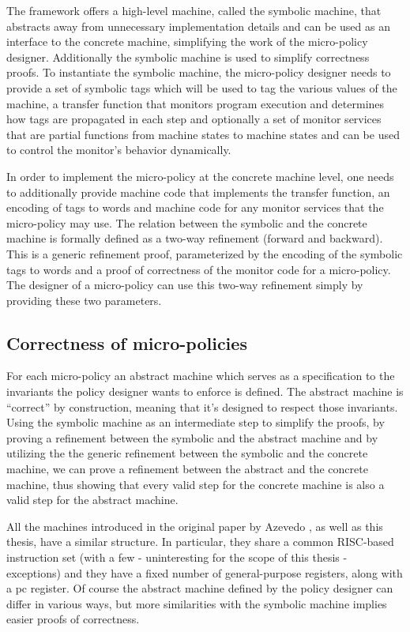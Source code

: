 The framework offers a high-level machine, called the symbolic machine, that
abstracts away from unnecessary implementation details and can be used as an 
interface to the concrete machine, simplifying the work of the micro-policy 
designer. Additionally the symbolic machine is used to simplify correctness 
proofs. To instantiate the symbolic machine, the micro-policy designer needs to
provide a set of symbolic tags which will be used to tag the various values of
the machine, a transfer function that monitors program execution and determines
how tags are propagated in each step and optionally a set of monitor services 
that are partial functions from machine states to machine states and can be used
to control the monitor's behavior dynamically.

In order to implement the micro-policy at the concrete machine level, one needs
to additionally provide machine code that implements the transfer function, an
encoding of tags to words and machine code for any monitor services that the
micro-policy may use. The relation between the symbolic and the concrete machine
is formally defined as a two-way refinement (forward and backward). This is a 
generic refinement proof, parameterized by the encoding of the symbolic tags to
words and a proof of correctness of the monitor code for a micro-policy.
The designer of a micro-policy can use this two-way refinement simply by
providing these two parameters.

\subsection{Correctness of micro-policies}\label{sec:verification}

For each micro-policy an abstract machine which serves as a specification to the
invariants the policy designer wants to enforce is defined. The abstract machine 
is ``correct'' by construction, meaning that it's designed to respect those 
invariants. Using the symbolic machine as an intermediate step to simplify the
proofs, by proving a refinement between the symbolic and the abstract machine 
and by utilizing the the generic refinement between the symbolic and the
concrete machine, we can prove a refinement between the abstract and
the concrete machine, thus showing that every valid step for the concrete
machine is also a valid step for the abstract machine. 

All the machines introduced in the original paper by Azevedo \ETAL 
\cite{pump_popl2015}, 
as well as this thesis, have a similar structure. In particular, they share a
common RISC-based instruction set (with a few - uninteresting for the scope of
this thesis - exceptions) and they have a fixed number of general-purpose
registers, along with a pc register. Of course the abstract machine defined
by the policy designer can differ in various ways, but more similarities with
the symbolic machine implies easier proofs of correctness.

